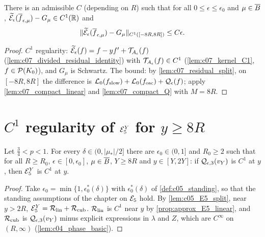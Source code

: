 \begin{proposition}
  \label{prop:approx_residual_compact}
  There is an admissible $C$ (depending on $R$) such that for all $0\le\epsilon\le\epsilon_0$ and $\mu\in\overline{B}$,
  $\widetilde{\mathcal{E}}_\epsilon(\overline{f}_{\epsilon,\mu})-G_\mu\in C^1(\mathbb{R})$ and
  \[\|\widetilde{\mathcal{E}}_\epsilon(\overline{f}_{\epsilon,\mu})-G_\mu\|_{C^1([-8R,8R])}\le C\epsilon.\]
\end{proposition}
\begin{proof}
  $C^1$ regularity: $\widetilde{\mathcal{E}}_\epsilon(f)=f-yf'+\mathcal{T}_{A_\epsilon}(f)$ (\cref{lem:c07_divided_residual_identity}) with
  $\mathcal{T}_{A_\epsilon}(f)\in C^1$ (\cref{lem:c07_kernel_C1}, $f\in\mathcal{P}(K_0)$), and $G_\mu$ is Schwartz.
  The bound: by \cref{lem:c07_residual_split}, on $[-8R,8R]$ the difference is
  $\mathcal{L}_0(f_{\textup{slow}})+\mathcal{L}_0(f_{\textup{osc}})+\mathcal{Q}_\epsilon(f)$; apply \cref{lem:c07_compact_linear} and \cref{lem:c07_compact_Q} with $M=8R$.
\end{proof}

\section{\texorpdfstring{$C^1$}{C1} regularity of \texorpdfstring{$\mathcal{E}_5^Y$}{E5} for \texorpdfstring{$y\ge8R$}{y >= 8R}}

\begin{lemma}
  \label{lem:c07_E5_C1}
  Let $\frac34<p<1$. For every $\delta\in(0,|\mu_*|/2]$ there are $\epsilon_0\in(0,1]$ and $R_0\ge2$ such that for all
  $R\ge R_0$, $\epsilon\in[0,\epsilon_0]$, $\mu\in\overline{B}$, $Y\ge8R$ and $y\in[Y,2Y]$: if $\mathcal{Q}_{\epsilon,3}(v_Y)$ is $C^1$
  at $y$, then $\mathcal{E}_5^Y$ is $C^1$ at $y$.
\end{lemma}
\begin{proof}
  Take $\epsilon_0=\min\{1,\epsilon_0^*(\delta)\}$ with $\epsilon_0^*(\delta)$ of \cref{def:c05_standing}, so that the
  standing assumptions of the chapter on $\mathcal{E}_5$ hold. By \cref{lem:c05_E5_split}, near $y>2R$,
  $\mathcal{E}_5^Y=\mathcal{R}_{\textup{lin}}+\mathcal{R}_{\textup{cub}}$. $\mathcal{R}_{\textup{lin}}$ is $C^1$ near $y$ by
  \cref{prop:approx_E5_linear}, and $\mathcal{R}_{\textup{cub}}$ is $\mathcal{Q}_{\epsilon,3}(v_Y)$ minus explicit expressions in
  $\lambda$ and $Z$, which are $C^\infty$ on $(R,\infty)$ (\cref{lem:c04_phase_basic}).
\end{proof}

